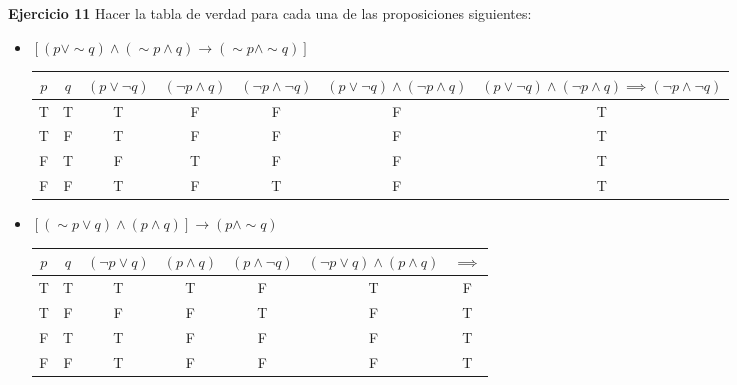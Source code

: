 \documentclass[a4paper,12pt]{article}
\begin{document}
\textbf{Ejercicio 11}
Hacer la tabla de verdad para cada una de las proposiciones siguientes:
\begin{itemize}
    \item $[(p \vee \sim q) \wedge(\sim p \wedge q) \rightarrow(\sim p \wedge \sim q)]$ \begin{table}[H]
\begin{tabular}{@{}c|c|c|c|c|c|c@{}}
\toprule
$p$ & $q$ & $(p\lor \neg q)$ & $(\neg p \land q)$ & $(\neg p \land \neg q)$ & $(p\lor \neg q) \land (\neg p \land q)$ & $(p\lor \neg q) \land (\neg p \land q)\implies (\neg p \land \neg q) $ \\ \midrule
T   & T   & T                & F                  & F                       & F                                       & T                                                                      \\
T   & F   & T                & F                  & F                       & F                                       & T                                                                      \\
F   & T   & F                & T                  & F                       & F                                       & T                                                                      \\
F   & F   & T                & F                  & T                       & F                                       & T                                                                      \\ \bottomrule
\end{tabular}
\end{table}
    \item $[(\sim p \vee q) \wedge(p \wedge q)] \rightarrow(p \wedge \sim q)$
\begin{table}[H]
\begin{tabular}{@{}c|c|c|c|c|c|c@{}}
\toprule
$p$ & $q$ & $(\neg p \lor q)$ & $(p\land q)$ & $(p\land \neg q)$ & $(\neg p \lor q)\land (p\land q)$ & $\implies$ \\ \midrule
T   & T   & T                 & T            & F                 & T                                 & F          \\
T   & F   & F                 & F            & T                 & F                                 & T          \\
F   & T   & T                 & F            & F                 & F                                 & T          \\
F   & F   & T                 & F            & F                 & F                                 & T          \\ \bottomrule
\end{tabular}
\end{table}    
    

\end{itemize}
\end{document}
